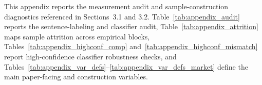 This appendix reports the measurement audit and sample-construction diagnostics referenced in Sections~3.1 and 3.2. Table~\ref{tab:appendix_audit} reports the sentence-labeling and classifier audit, Table~\ref{tab:appendix_attrition} maps sample attrition across empirical blocks, Tables~\ref{tab:appendix_highconf_comp} and~\ref{tab:appendix_highconf_mismatch} report high-confidence classifier robustness checks, and Tables~\ref{tab:appendix_var_defs}--\ref{tab:appendix_var_defs_market} define the main paper-facing and construction variables.










